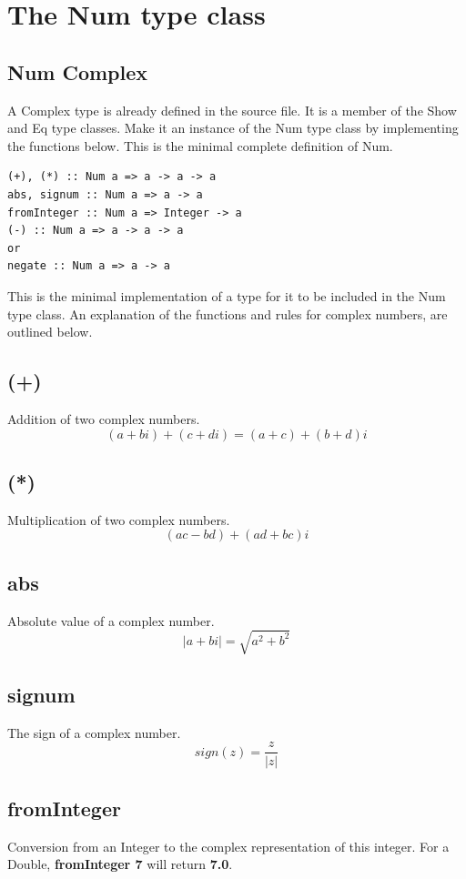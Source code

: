 \documentclass{article}
\begin{document}
\section{The Num type class}
\subsection{Num Complex}
A Complex type is already defined in the source file. It is a member of the Show and Eq type classes. Make it an instance of the Num type class by implementing the functions below. This is the minimal complete definition of Num.
\lstset{language=Haskell}
\begin{lstlisting}
(+), (*) :: Num a => a -> a -> a
abs, signum :: Num a => a -> a
fromInteger :: Num a => Integer -> a
(-) :: Num a => a -> a -> a
or
negate :: Num a => a -> a
\end{lstlisting}
This is the minimal implementation of a type for it to be included in the Num type class. An explanation of the functions and rules for complex numbers, are outlined below.

\subsection{(+)}
Addition of two complex numbers.
\[(a+bi)+(c+di)=(a+c)+(b+d)i\]

\subsection{(*)}
Multiplication of two complex numbers.
\[(ac-bd) + (ad+bc)i\]

\subsection{abs}
Absolute value of a complex number.
\[|a+bi|=\sqrt{a^2+b^2}\]

\subsection{signum}
The sign of a complex number.
\[sign(z) = \frac{z}{|z|}\]

\subsection{fromInteger}
Conversion from an Integer to the complex representation of this integer. For a Double, \textbf{fromInteger 7} will return \textbf{7.0}.
\end{document}
